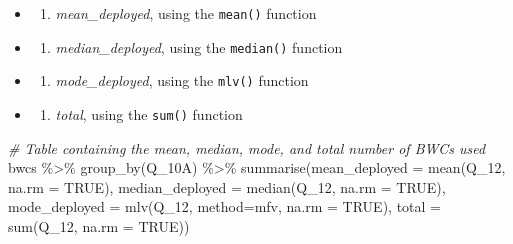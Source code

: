 \documentclass[
]{book}
\newenvironment{Shaded}{\begin{snugshade}}{\end{snugshade}}
\newcommand{\AttributeTok}[1]{\textcolor[rgb]{0.77,0.63,0.00}{#1}}
\newcommand{\CommentTok}[1]{\textcolor[rgb]{0.56,0.35,0.01}{\textit{#1}}}
\newcommand{\ConstantTok}[1]{\textcolor[rgb]{0.00,0.00,0.00}{#1}}
\newcommand{\FunctionTok}[1]{\textcolor[rgb]{0.00,0.00,0.00}{#1}}
\newcommand{\NormalTok}[1]{#1}
\newcommand{\SpecialCharTok}[1]{\textcolor[rgb]{0.00,0.00,0.00}{#1}}
\newcommand{\StringTok}[1]{\textcolor[rgb]{0.31,0.60,0.02}{#1}}
\providecommand{\tightlist}{%
  \setlength{\itemsep}{0pt}\setlength{\parskip}{0pt}}
\begin{document}
\begin{itemize}
\item
  \begin{enumerate}
  \def\labelenumi{(\arabic{enumi})}
  \tightlist
  \item
    \emph{mean\_deployed}, using the \texttt{mean()} function
  \end{enumerate}
\item
  \begin{enumerate}
  \def\labelenumi{(\arabic{enumi})}
  \setcounter{enumi}{1}
  \tightlist
  \item
    \emph{median\_deployed}, using the \texttt{median()} function
  \end{enumerate}
\item
  \begin{enumerate}
  \def\labelenumi{(\arabic{enumi})}
  \setcounter{enumi}{2}
  \tightlist
  \item
    \emph{mode\_deployed}, using the \texttt{mlv()} function
  \end{enumerate}
\item
  \begin{enumerate}
  \def\labelenumi{(\arabic{enumi})}
  \setcounter{enumi}{3}
  \tightlist
  \item
    \emph{total}, using the \texttt{sum()} function
  \end{enumerate}
\end{itemize}

\begin{Shaded}
\begin{Highlighting}[]
\CommentTok{\# Table containing the mean, median, mode, and total number of BWCs used }
\NormalTok{bwcs }\SpecialCharTok{\%\textgreater{}\%}
  \FunctionTok{group\_by}\NormalTok{(Q\_10A) }\SpecialCharTok{\%\textgreater{}\%} 
  \FunctionTok{summarise}\NormalTok{(}\AttributeTok{mean\_deployed =} \FunctionTok{mean}\NormalTok{(Q\_12, }\AttributeTok{na.rm =} \ConstantTok{TRUE}\NormalTok{),}
            \AttributeTok{median\_deployed =} \FunctionTok{median}\NormalTok{(Q\_12, }\AttributeTok{na.rm =} \ConstantTok{TRUE}\NormalTok{), }
            \AttributeTok{mode\_deployed =} \FunctionTok{mlv}\NormalTok{(Q\_12, }\AttributeTok{method=}\StringTok{\textquotesingle{}mfv\textquotesingle{}}\NormalTok{, }\AttributeTok{na.rm =} \ConstantTok{TRUE}\NormalTok{), }
            \AttributeTok{total =} \FunctionTok{sum}\NormalTok{(Q\_12, }\AttributeTok{na.rm =} \ConstantTok{TRUE}\NormalTok{))}
\end{Highlighting}
\end{Shaded}
\end{document}
